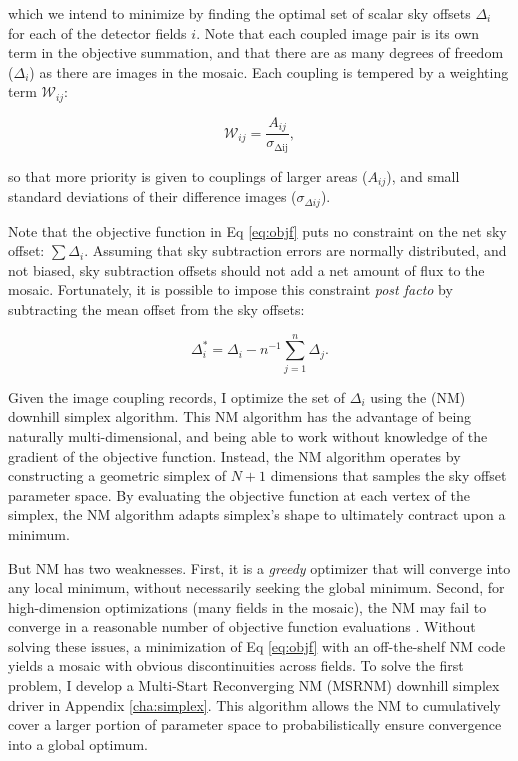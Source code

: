 \documentclass[iop]{emulateapj}
\begin{document}
\noindent which we intend to minimize by finding the optimal set of scalar sky offsets $\Delta_i$ for each of the detector fields $i$. Note that each coupled image pair is its own term in the objective summation, and that there are as many degrees of freedom ($\Delta_i$) as there are images in the mosaic. Each coupling is tempered by a weighting term $\mathcal{W}_{ij}$:

\begin{equation}
    \mathcal{W}_{ij} = \frac{A_{ij}}{\sigma_{\mathrm{\Delta ij}}},
\end{equation}

\noindent so that more priority is given to couplings of larger areas ($A_{ij}$), and small standard deviations of their difference images ($\sigma_{\Delta ij}$).

Note that the objective function in Eq \ref{eq:objf} puts no constraint on the net sky offset: $\sum \Delta_i$. Assuming that sky subtraction errors are normally distributed, and not biased, sky subtraction offsets should not add a net amount of flux to the mosaic. Fortunately, it is possible to impose this constraint \textit{post facto} by subtracting the mean offset from the sky offsets:

\begin{equation}
    \Delta_i^* = \Delta_i - n^{-1}\sum_{j=1}^n \Delta_j.
    \label{eq:netzero}
\end{equation}

Given the image coupling records, I optimize the set of $\Delta_i$ using the \cite{Nelder:1965} (NM) downhill simplex algorithm. This NM algorithm has the advantage of being naturally multi-dimensional, and being able to work without knowledge of the gradient of the objective function. Instead, the NM algorithm operates by constructing a geometric simplex of $N+1$ dimensions that samples the sky offset parameter space. By evaluating the objective function at each vertex of the simplex, the NM algorithm adapts simplex's shape to ultimately contract upon a minimum.

But NM has two weaknesses. First, it is a \emph{greedy} optimizer that will converge into any local minimum, without necessarily seeking the global minimum. Second, for high-dimension optimizations (many fields in the mosaic), the NM may fail to converge in a reasonable number of objective function evaluations \citep{Neumann:2006}. Without solving these issues, a minimization of Eq \ref{eq:objf} with an off-the-shelf NM code yields a mosaic with obvious discontinuities across fields. To solve the first problem, I develop a Multi-Start Reconverging NM (MSRNM) downhill simplex driver in Appendix \ref{cha:simplex}. This algorithm allows the NM to cumulatively cover a larger portion of parameter space to probabilistically ensure convergence into a global optimum.
\end{document}

